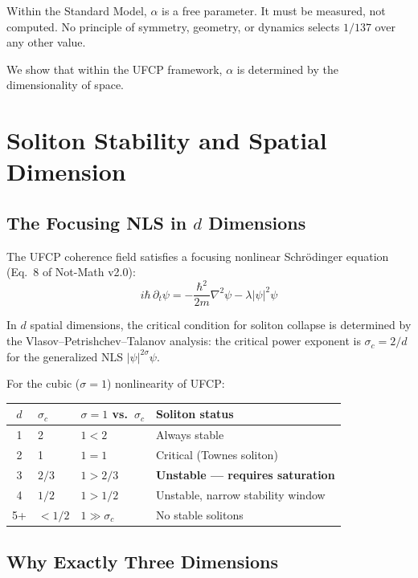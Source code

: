 \documentclass[11pt, a4paper]{article}
\begin{document}
Within the Standard Model, $\alpha$ is a free parameter. It must
be measured, not computed. No principle of symmetry, geometry, or
dynamics selects $1/137$ over any other value.

We show that within the UFCP framework, $\alpha$ is determined by
the dimensionality of space.

\section{Soliton Stability and Spatial Dimension}

\subsection{The Focusing NLS in $d$ Dimensions}

The UFCP coherence field satisfies a focusing nonlinear
Schr\"odinger equation (Eq.~8 of Not-Math v2.0):
\begin{equation}
  i\hbar\,\partial_t\psi =
  -\frac{\hbar^2}{2m}\nabla^2\psi - \lambda|\psi|^2\psi
  \label{eq:nls}
\end{equation}

In $d$ spatial dimensions, the critical condition for soliton
collapse is determined by the Vlasov--Petrishchev--Talanov
analysis: the critical power exponent is $\sigma_c = 2/d$ for
the generalized NLS $|\psi|^{2\sigma}\psi$.

For the cubic ($\sigma = 1$) nonlinearity of UFCP:
\begin{center}
\begin{tabular}{@{}clll@{}}
\toprule
$d$ & $\sigma_c$ & $\sigma = 1$ vs.\ $\sigma_c$ & \textbf{Soliton status} \\
\midrule
1 & 2     & $1 < 2$  & Always stable \\
2 & 1     & $1 = 1$  & Critical (Townes soliton) \\
3 & $2/3$ & $1 > 2/3$ & \textbf{Unstable --- requires saturation} \\
4 & $1/2$ & $1 > 1/2$ & Unstable, narrow stability window \\
5+ & $<1/2$ & $1 \gg \sigma_c$ & No stable solitons \\
\bottomrule
\end{tabular}
\end{center}

\subsection{Why Exactly Three Dimensions}
\end{document}
